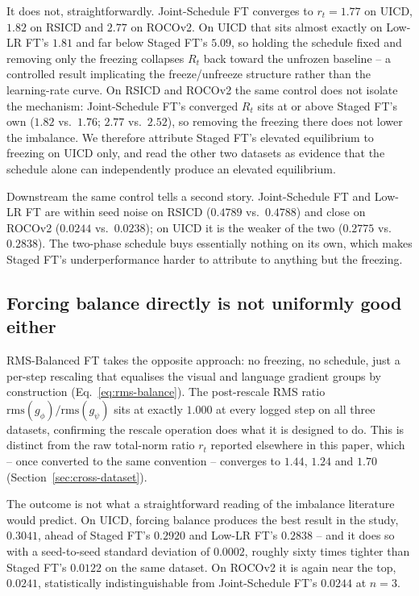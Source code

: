 \documentclass[journal]{IEEEtran}
\begin{document}
It does not, straightforwardly. Joint-Schedule FT converges to
$r_t = 1.77$ on UICD, $1.82$ on RSICD and $2.77$ on ROCOv2. On UICD
that sits almost exactly on Low-LR FT's $1.81$ and far below Staged
FT's $5.09$, so holding the schedule fixed and removing only the
freezing collapses $R_t$ back toward the unfrozen baseline -- a
controlled result implicating the freeze/unfreeze structure rather
than the learning-rate curve. On RSICD and ROCOv2 the same control
does not isolate the mechanism: Joint-Schedule FT's converged $R_t$
sits at or above Staged FT's own ($1.82$ vs.\ $1.76$; $2.77$
vs.\ $2.52$), so removing the freezing there does not lower the
imbalance. We therefore attribute Staged FT's elevated equilibrium to
freezing on UICD only, and read the other two datasets as evidence
that the schedule alone can independently produce an elevated
equilibrium.

Downstream the same control tells a second story. Joint-Schedule FT
and Low-LR FT are within seed noise on RSICD ($0.4789$
vs.\ $0.4788$) and close on ROCOv2 ($0.0244$ vs.\ $0.0238$); on UICD
it is the weaker of the two ($0.2775$ vs.\ $0.2838$). The two-phase
schedule buys essentially nothing on its own, which makes Staged FT's
underperformance harder to attribute to anything but the freezing.

\subsection{Forcing balance directly is not uniformly good either}
RMS-Balanced FT takes the opposite approach: no freezing, no
schedule, just a per-step rescaling that equalises the visual and
language gradient groups by construction
(Eq.~\ref{eq:rms-balance}). The post-rescale RMS ratio
$\mathrm{rms}(g_\phi)/\mathrm{rms}(g_\psi)$ sits at exactly
$1.000$ at every logged step on all three datasets, confirming
the rescale operation does what it is designed to do. This is
distinct from the raw total-norm ratio $r_t$ reported elsewhere
in this paper, which -- once converted to the same convention --
converges to $1.44$, $1.24$ and $1.70$
(Section~\ref{sec:cross-dataset}).

The outcome is not what a straightforward reading of the
imbalance literature would predict. On UICD, forcing balance
produces the best result in the study, $0.3041$, ahead of Staged
FT's $0.2920$ and Low-LR FT's $0.2838$ -- and it does so with a
seed-to-seed standard deviation of $0.0002$, roughly sixty times
tighter than Staged FT's $0.0122$ on the same dataset. On ROCOv2
it is again near the top, $0.0241$, statistically
indistinguishable from Joint-Schedule FT's $0.0244$ at $n{=}3$.
\end{document}

